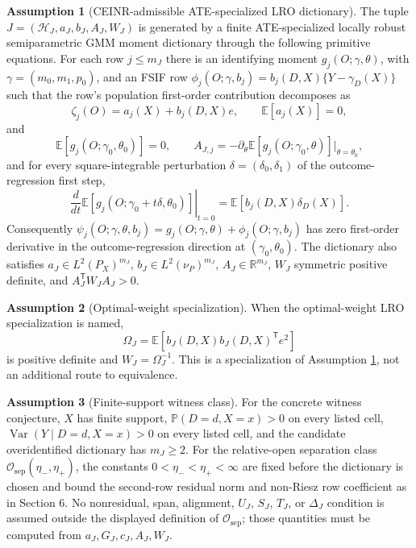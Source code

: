 \documentclass[11pt]{article}
\newcommand{\E}{\mathbb{E}}
\renewcommand{\Pr}{\mathbb{P}}
\newcommand{\transpose}{\mathsf{T}}
\newcommand{\R}{\mathbb{R}}
\theoremstyle{definition}
\newtheorem{assumption}{Assumption}
\theoremstyle{plain}
\theoremstyle{remark}
\begin{document}
\begin{assumption}[CEINR-admissible ATE-specialized LRO dictionary]\label{ass:ceinr}
The tuple \(J=(\mathcal H_J,a_J,b_J,A_J,W_J)\) is generated by a finite
ATE-specialized locally robust semiparametric GMM moment dictionary through the
following primitive equations.  For each row \(j\le m_J\) there is an
identifying moment \(g_j(O;\gamma,\theta)\), with
\(\gamma=(m_0,m_1,p_0)\), and an FSIF row
\(\phi_j(O;\gamma,b_j)=b_j(D,X)\{Y-\gamma_D(X)\}\) such that the row's
population first-order contribution decomposes as
\[
\zeta_j(O)=a_j(X)+b_j(D,X)e,\qquad \E[a_j(X)]=0,
\]
and
\[
\E[g_j(O;\gamma_0,\theta_0)]=0,\qquad
A_{J,j}=-\partial_\theta \E[g_j(O;\gamma_0,\theta)]|_{\theta=\theta_0},
\]
and for every square-integrable perturbation
\(\delta=(\delta_0,\delta_1)\) of the outcome-regression first step,
\[
\left.\frac{d}{dt}\E[g_j(O;\gamma_0+t\delta,\theta_0)]\right|_{t=0}
=\E[b_j(D,X)\delta_D(X)].
\]
Consequently
\(\psi_j(O;\gamma,\theta,b_j)=g_j(O;\gamma,\theta)+\phi_j(O;\gamma,b_j)\)
has zero first-order derivative in the outcome-regression direction at
\((\gamma_0,\theta_0)\).  The dictionary also satisfies
\(a_J\in L^2(P_X)^{m_J}\), \(b_J\in L^2(\nu_P)^{m_J}\),
\(A_J\in\R^{m_J}\), \(W_J\) symmetric positive definite, and
\(A_J^\transpose W_JA_J>0\).
\end{assumption}

\begin{assumption}[Optimal-weight specialization]\label{ass:optimal-weight}
When the optimal-weight LRO specialization is named,
\[
\Omega_J=\E[b_J(D,X)b_J(D,X)^\transpose e^2]
\]
is positive definite and \(W_J=\Omega_J^{-1}\).  This is a specialization of
Assumption \ref{ass:ceinr}, not an additional route to equivalence.
\end{assumption}

\begin{assumption}[Finite-support witness class]\label{ass:finite-support}
For the concrete witness conjecture, \(X\) has finite support,
\(\Pr(D=d,X=x)>0\) on every listed cell, \(\operatorname{Var}(Y\mid D=d,X=x)>0\)
on every listed cell, and the candidate overidentified dictionary has
\(m_J\ge2\).  For the relative-open separation class
\(\mathcal O_{\mathrm{sep}}(\eta_-,\eta_+)\), the constants
\(0<\eta_-<\eta_+<\infty\) are fixed before the dictionary is chosen and bound
the second-row residual norm and non-Riesz row coefficient as in Section 6.
No nonresidual, span, alignment, \(U_J\), \(S_J\), \(T_J\), or \(\Delta_J\)
condition is assumed outside the displayed definition of
\(\mathcal O_{\mathrm{sep}}\); those quantities must be computed from
\(a_J,G_J,c_J,A_J,W_J\).
\end{assumption}
\end{document}
